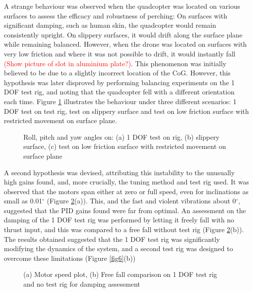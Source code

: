 \documentclass[12pt,a4paper]{article}
\begin{document}
A strange behaviour was observed when the quadcopter was located on various surfaces to assess the efficacy and robustness of perching: On surfaces with significant damping, such as human skin, the quadcopter would remain consistently upright. On slippery surfaces, it would drift along the surface plane while remaining balanced. However, when the drone was located on surfaces with very low friction and where it was not possible to drift, it would instantly fall \textcolor{red}{(Show picture of slot in aluminium plate?)}. This phenomenon was initially believed to be due to a slightly incorrect location of the CoG. However, this hypothesis was later disproved by performing balancing experiments on the 1 DOF test rig, and noting that the quadcopter fell with a different orientation each time. Figure \ref{fig7} illustrates the behaviour under three different scenarios: 1 DOF test on test rig, test on slippery surface and test on low friction surface with restricted movement on surface plane.


\begin{figure}[h!]
\centering
  \caption{Roll, pitch and yaw angles on: (a) 1 DOF test on rig, (b) slippery surface, (c) test on low friction surface with restricted movement on surface plane}
  \label{fig7}
\end{figure}

A second hypothesis was devised, attributing this instability to the unusually high gains found, and, more crucially, the tuning method and test rig used. It was observed that the motors span either at zero or full speed, even for inclinations as small as 0.01$^{\circ}$ (Figure \ref{fig8}(a)). This, and the fast and violent vibrations about 0$^{\circ}$, suggested that the PID gains found were far from optimal. An assessment on the damping of the 1 DOF test rig was performed by letting it freely fall with no thrust input, and this was compared to a free fall without test rig (Figure \ref{fig8}(b)). The results obtained suggested that the 1 DOF test rig was significantly modifying the dynamics of the system, and a second test rig was designed to overcome these limitations (Figure \ref{fig6}(b))


\begin{figure}[h!]
\centering
  \caption{(a) Motor speed plot, (b) Free fall comparison on 1 DOF test rig and no test rig for damping assessment}
  \label{fig8}
\end{figure}
\end{document}
